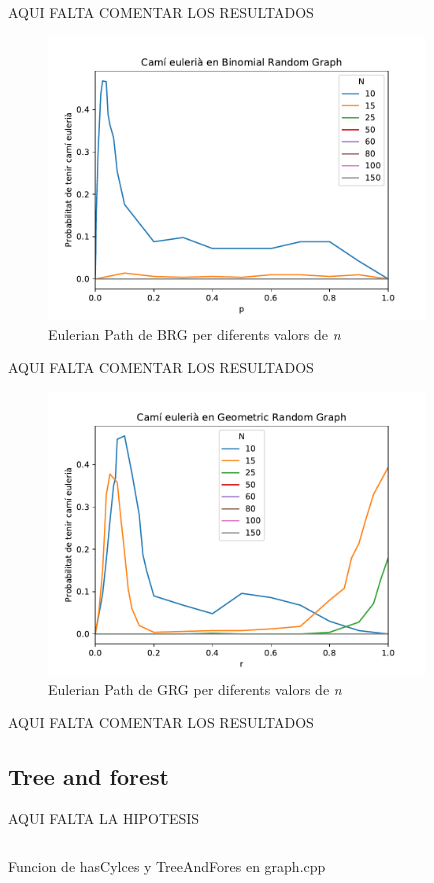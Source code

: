 AQUI FALTA COMENTAR LOS RESULTADOS

\begin{figure}[H]
    \centering
    \includegraphics[width=10cm]{plots/BRG_eulerianPath.pdf}
    \caption{Eulerian Path de BRG per diferents valors de \textit{n}}
    \label{fig:connect_04}
\end{figure}

AQUI FALTA COMENTAR LOS RESULTADOS

\begin{figure}[H]
    \centering
    \includegraphics[width=10cm]{plots/GRG_eulerianPath.pdf}
    \caption{Eulerian Path de GRG per diferents valors de \textit{n}}
    \label{fig:connect_04}
\end{figure}

AQUI FALTA COMENTAR LOS RESULTADOS

\subsection{Tree and forest}
AQUI FALTA LA HIPOTESIS

\begin{listing}
\inputminted[firstline=27,lastline=66]{cpp}{src/graph.cpp}
\caption{Funcion de hasCylces y TreeAndFores en graph.cpp}
\end{listing}

